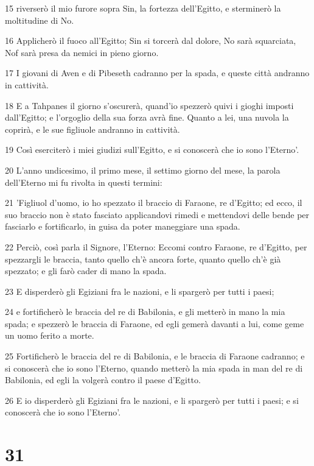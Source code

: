\par 15 riverserò il mio furore sopra Sin, la fortezza dell'Egitto, e sterminerò la moltitudine di No.
\par 16 Applicherò il fuoco all'Egitto; Sin si torcerà dal dolore, No sarà squarciata, Nof sarà presa da nemici in pieno giorno.
\par 17 I giovani di Aven e di Pibeseth cadranno per la spada, e queste città andranno in cattività.
\par 18 E a Tahpanes il giorno s'oscurerà, quand'io spezzerò quivi i gioghi imposti dall'Egitto; e l'orgoglio della sua forza avrà fine. Quanto a lei, una nuvola la coprirà, e le sue figliuole andranno in cattività.
\par 19 Così eserciterò i miei giudizi sull'Egitto, e si conoscerà che io sono l'Eterno'.
\par 20 L'anno undicesimo, il primo mese, il settimo giorno del mese, la parola dell'Eterno mi fu rivolta in questi termini:
\par 21 'Figliuol d'uomo, io ho spezzato il braccio di Faraone, re d'Egitto; ed ecco, il suo braccio non è stato fasciato applicandovi rimedi e mettendovi delle bende per fasciarlo e fortificarlo, in guisa da poter maneggiare una spada.
\par 22 Perciò, così parla il Signore, l'Eterno: Eccomi contro Faraone, re d'Egitto, per spezzargli le braccia, tanto quello ch'è ancora forte, quanto quello ch'è già spezzato; e gli farò cader di mano la spada.
\par 23 E disperderò gli Egiziani fra le nazioni, e li spargerò per tutti i paesi;
\par 24 e fortificherò le braccia del re di Babilonia, e gli metterò in mano la mia spada; e spezzerò le braccia di Faraone, ed egli gemerà davanti a lui, come geme un uomo ferito a morte.
\par 25 Fortificherò le braccia del re di Babilonia, e le braccia di Faraone cadranno; e si conoscerà che io sono l'Eterno, quando metterò la mia spada in man del re di Babilonia, ed egli la volgerà contro il paese d'Egitto.
\par 26 E io disperderò gli Egiziani fra le nazioni, e li spargerò per tutti i paesi; e si conoscerà che io sono l'Eterno'.

\chapter{31}


